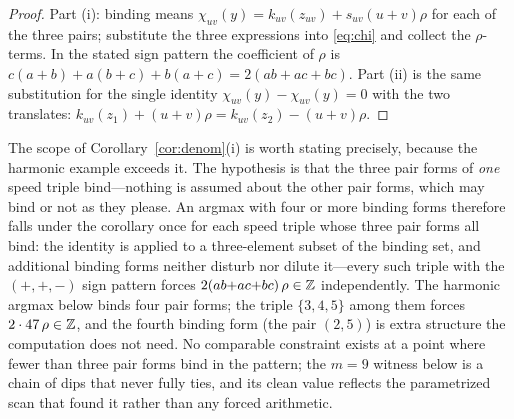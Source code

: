 \begin{proof}
Part (i): binding means
$\chi_{uv}(y)=k_{uv}(z_{uv})+s_{uv}(u{+}v)\rho$ for each of the three
pairs; substitute the three expressions into \eqref{eq:chi} and collect
the $\rho$-terms. In the stated sign pattern the coefficient of $\rho$
is $c(a+b)+a(b+c)+b(a+c)=2(ab+ac+bc)$. Part (ii) is the same
substitution for the single identity $\chi_{uv}(y)-\chi_{uv}(y)=0$ with
the two translates: $k_{uv}(z_1)+(u{+}v)\rho=k_{uv}(z_2)-(u{+}v)\rho$.
\end{proof}

The scope of Corollary~\ref{cor:denom}(i) is worth stating
precisely, because the harmonic example exceeds it. The hypothesis is
that the three pair forms of \emph{one} speed triple bind---nothing is
assumed about the other pair forms, which may bind or not as they
please. An argmax with four or more binding forms therefore falls
under the corollary once for each speed triple whose three pair forms
all bind: the identity is applied to a three-element subset of the
binding set, and additional binding forms neither disturb nor dilute
it---every such triple with the $(+,+,-)$ sign pattern forces
$2(ab{+}ac{+}bc)\,\rho\in\mathbb{Z}$ independently. The harmonic argmax below
binds four pair forms; the triple $\{3,4,5\}$ among them forces
$2\cdot47\,\rho\in\mathbb{Z}$, and the fourth binding form (the pair $(2,5)$)
is extra structure the computation does not need. No comparable
constraint exists at a point where fewer than three pair forms bind in
the pattern; the $m=9$ witness below is a chain of dips that never
fully ties, and its clean value reflects the parametrized scan that
found it rather than any forced arithmetic.

